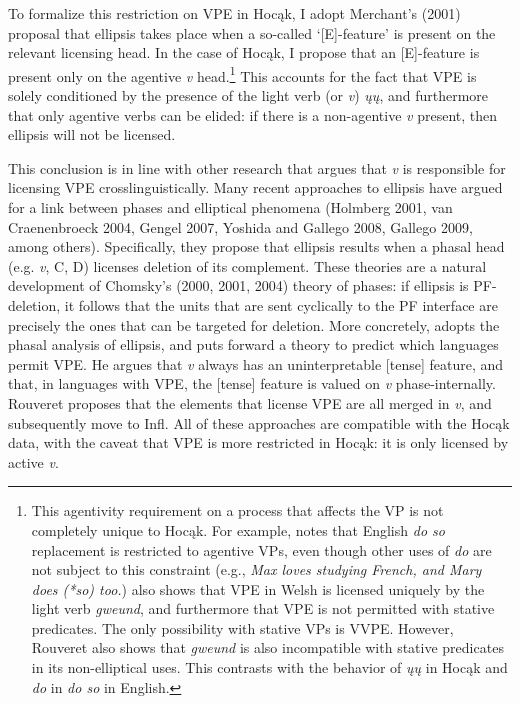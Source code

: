\documentclass[output=paper]{LSP/langsci}
\begin{document}
To formalize this restriction on VPE in Hocąk, I adopt Merchant's (2001) proposal that ellipsis takes place when a so-called `[E]-feature' is present on the relevant licensing head. In the case of Hocąk, I propose that an [E]-feature is present only on the agentive \emph{v} head.\footnote{This agentivity requirement on a process that affects the VP is not completely unique to Hocąk. For example, \citet{Hallman2004} notes that English \emph{do so} replacement is restricted to agentive VPs, even though other uses of \emph{do} are not subject to this constraint (e.g., \emph{Max loves studying French, and Mary does (*so) too.}) \citet{Rouveret2012} also shows that VPE in Welsh is licensed uniquely by the light verb \emph{gweund}, and furthermore that VPE is not permitted with stative predicates. The only possibility with stative VPs is VVPE. However, Rouveret also shows that \emph{gweund} is also incompatible with stative predicates in its non-elliptical uses. This contrasts with the behavior of \emph{ųų} in Hocąk and \emph{do} in \emph{do so} in English.}  This accounts for the fact that VPE is solely conditioned by the presence of the light verb (or \emph{v}) \emph{ųų}, and furthermore that only agentive verbs can be elided: if there is a non-agentive \emph{v} present, then ellipsis will not be licensed. 

This conclusion is in line with other research that argues that \emph{v} is responsible for licensing VPE crosslinguistically. Many recent approaches to ellipsis have argued for a link between phases and elliptical phenomena (Holmberg 2001, van Craenenbroeck 2004, Gengel 2007, Yoshida and Gallego 2008, Gallego 2009, among others). Specifically, they propose that ellipsis results when a phasal head (e.g. \emph{v}, C, D) licenses deletion of its complement. These theories are a natural development of Chomsky's (2000, 2001, 2004) theory of phases: if ellipsis is PF-deletion, it follows that the units that are sent cyclically to the PF interface are precisely the ones that can be targeted for deletion. More concretely, \citet{Rouveret2012} adopts the phasal analysis of ellipsis, and puts forward a theory to predict which languages permit VPE. He argues that \emph{v} always has an uninterpretable [tense] feature, and that, in languages with VPE, the [tense] feature is valued on \emph{v} phase-internally. Rouveret proposes that the elements that license VPE are all merged in \emph{v}, and subsequently move to Infl. All of these approaches are compatible with the Hocąk data, with the caveat that VPE is more restricted in Hocąk: it is only licensed by active \emph{v}.
\end{document}
